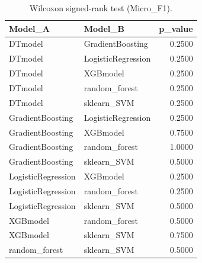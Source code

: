 \begin{table}[t]
\centering
\begin{tabular}{llr}
\toprule
Model_A & Model_B & p_value \\
\midrule
DTmodel & GradientBoosting & 0.2500 \\
DTmodel & LogisticRegression & 0.2500 \\
DTmodel & XGBmodel & 0.2500 \\
DTmodel & random_forest & 0.2500 \\
DTmodel & sklearn_SVM & 0.2500 \\
GradientBoosting & LogisticRegression & 0.2500 \\
GradientBoosting & XGBmodel & 0.7500 \\
GradientBoosting & random_forest & 1.0000 \\
GradientBoosting & sklearn_SVM & 0.5000 \\
LogisticRegression & XGBmodel & 0.2500 \\
LogisticRegression & random_forest & 0.2500 \\
LogisticRegression & sklearn_SVM & 0.5000 \\
XGBmodel & random_forest & 0.5000 \\
XGBmodel & sklearn_SVM & 0.7500 \\
random_forest & sklearn_SVM & 0.5000 \\
\bottomrule
\end{tabular}
\caption{Wilcoxon signed-rank test (Micro_F1).}
\label{tab:wilcoxon_Micro_F1}
\end{table}